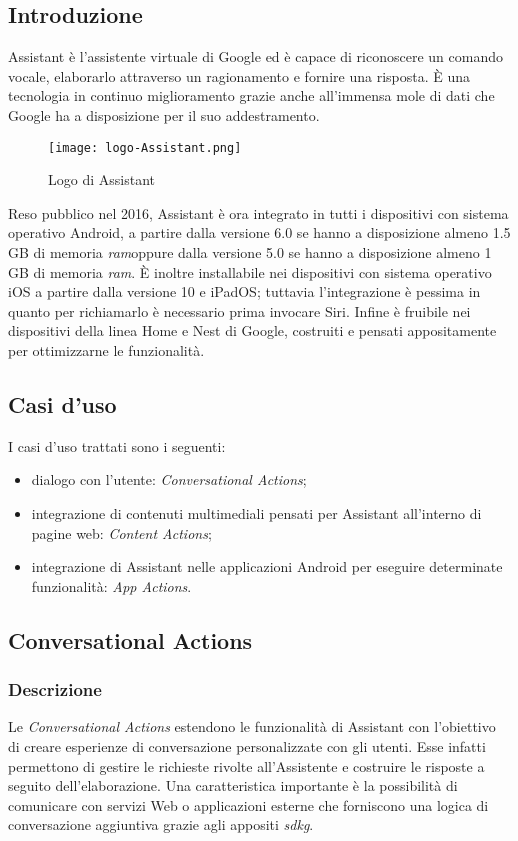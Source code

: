 	\subsection{Introduzione}
	Assistant è l'assistente virtuale di Google ed è capace di riconoscere un comando vocale, elaborarlo attraverso un ragionamento e fornire una risposta. È una tecnologia in continuo miglioramento grazie anche all'immensa mole di dati che Google ha a disposizione per il suo addestramento.
	
	\begin{figure}[htbp]
		\begin{center}
			\texttt{[image: logo-Assistant.png]}
			\caption{Logo di Assistant}
		\end{center}
	\end{figure}
\pagebreak
	
	Reso pubblico nel 2016, Assistant è ora integrato in tutti i dispositivi con sistema operativo Android, a partire dalla versione 6.0 se hanno a disposizione almeno 1.5 GB di memoria \emph{\gls{ram}}\glsfirstoccur oppure dalla versione 5.0 se hanno a disposizione almeno 1 GB di memoria \emph{\gls{ram}}. È inoltre installabile nei dispositivi con sistema operativo iOS a partire dalla versione 10 e iPadOS; tuttavia l'integrazione è pessima in quanto per richiamarlo è necessario prima invocare Siri. Infine è fruibile nei dispositivi della linea Home e Nest di Google, costruiti e pensati appositamente per ottimizzarne le funzionalità.
	\subsection{Casi d'uso}
	I casi d'uso trattati sono i seguenti:
	\begin{itemize}
		\item dialogo con l'utente: \emph{Conversational Actions};
		\item integrazione di contenuti multimediali pensati per Assistant all'interno di pagine web: \emph{Content Actions};
		\item integrazione di Assistant nelle applicazioni Android per eseguire determinate funzionalità: \emph{App Actions}.
	\end{itemize}
	\subsection{Conversational Actions}
		\subsubsection{Descrizione}
		Le \emph{Conversational Actions} estendono le funzionalità di Assistant con l'obiettivo di creare esperienze di conversazione personalizzate con gli utenti. Esse infatti permettono di gestire le richieste rivolte all'Assistente e costruire le risposte a seguito dell'elaborazione. Una caratteristica importante è la possibilità di comunicare con servizi Web o applicazioni esterne che forniscono una logica di conversazione aggiuntiva grazie agli appositi \emph{\gls{sdkg}}.
